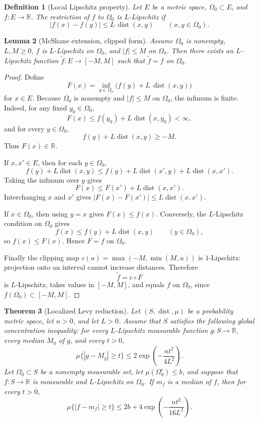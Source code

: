 \documentclass[11pt,oneside]{book}
\newtheorem{theorem}{Theorem}[chapter]
\newtheorem{lemma}[theorem]{Lemma}
\newtheorem{definition}[theorem]{Definition}
\DeclareMathOperator{\dist}{dist}
\newcommand{\R}{\mathbb R}
\newcommand{\1}{\mathbf 1}
\begin{document}
\begin{definition}[Local Lipschitz property]
Let \(E\) be a metric space, \(\Omega_0\subset E\), and \(f:E\to\R\).  The
restriction of \(f\) to \(\Omega_0\) is \(L\)-Lipschitz if
\[
  |f(x)-f(y)|\le L\,\dist(x,y)\qquad(x,y\in\Omega_0).
\]
\end{definition}

\begin{lemma}[McShane extension, clipped form]
Assume \(\Omega_0\) is nonempty, \(L,M\ge0\), \(f\) is \(L\)-Lipschitz on
\(\Omega_0\), and \(|f|\le M\) on \(\Omega_0\).  Then there exists an
\(L\)-Lipschitz function
\(\widetilde f:E\to[-M,M]\) such that \(\widetilde f=f\) on \(\Omega_0\).
\end{lemma}

\begin{proof}
Define
\[
  F(x)=\inf_{y\in\Omega_0}\bigl(f(y)+L\,\dist(x,y)\bigr)
\]
for \(x\in E\).  Because \(\Omega_0\) is nonempty and \(|f|\le M\) on
\(\Omega_0\), the infimum is finite.  Indeed, for any fixed \(y_0\in\Omega_0\),
\[
  F(x)\le f(y_0)+L\dist(x,y_0)<\infty,
\]
and for every \(y\in\Omega_0\),
\[
  f(y)+L\dist(x,y)
  \ge
  -M.
\]
Thus \(F(x)\in\R\).

If \(x,x'\in E\), then for each \(y\in\Omega_0\),
\[
  f(y)+L\dist(x,y)
  \le
  f(y)+L\dist(x',y)+L\dist(x,x').
\]
Taking the infimum over \(y\) gives
\[
  F(x)\le F(x')+L\dist(x,x').
\]
Interchanging \(x\) and \(x'\) gives \(|F(x)-F(x')|\le L\dist(x,x')\).

If \(x\in\Omega_0\), then using \(y=x\) gives \(F(x)\le f(x)\).  Conversely,
the \(L\)-Lipschitz condition on \(\Omega_0\) gives
\[
  f(x)\le f(y)+L\dist(x,y)\qquad(y\in\Omega_0),
\]
so \(f(x)\le F(x)\).  Hence \(F=f\) on \(\Omega_0\).

Finally the clipping map \(c(u)=\max(-M,\min(M,u))\) is \(1\)-Lipschitz:
projection onto an interval cannot increase distances.  Therefore
\[
  \widetilde f=c\circ F
\]
is \(L\)-Lipschitz, takes values in \([-M,M]\), and equals \(f\) on
\(\Omega_0\), since \(f(\Omega_0)\subset[-M,M]\).
\end{proof}

\begin{theorem}[Localized Levy reduction]
Let \((S,\dist,\mu)\) be a probability metric space, let \(n>0\), and let
\(L>0\).  Assume that \(S\) satisfies the following global concentration
inequality: for every \(L\)-Lipschitz measurable function \(g:S\to\R\), every
median \(M_g\) of \(g\), and every \(t>0\),
\[
  \mu\{|g-M_g|\ge t\}\le
  2\exp\!\left(-\frac{n t^2}{4L^2}\right)
  .
\]
Let
\(\Omega_0\subset S\) be a nonempty measurable set, let
\(\mu(\Omega_0^c)\le b\), and suppose that \(f:S\to\R\) is measurable and
\(L\)-Lipschitz on \(\Omega_0\).  If \(m_f\) is a median of \(f\), then for
every \(t>0\),
\[
  \mu\{|f-m_f|\ge t\}
  \le
  2b+4\exp\!\left(-\frac{n t^2}{16L^2}\right).
\]
\end{theorem}
\end{document}

